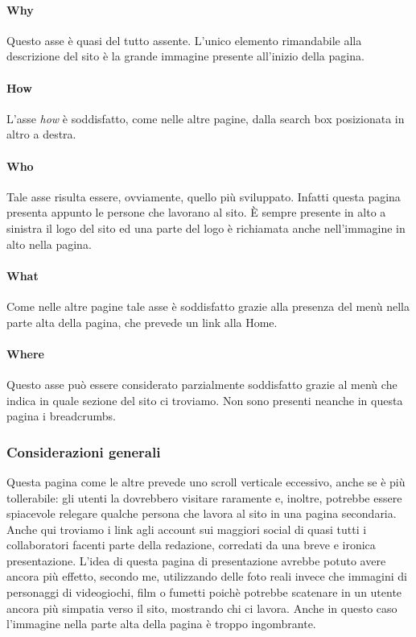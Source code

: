 \documentclass[../ProgettoTecWeb2.tex]{subfiles}
\begin{document}
			\paragraph{Why}
			Questo asse è quasi del tutto assente. L'unico elemento rimandabile alla descrizione del sito è la grande immagine presente all'inizio della pagina.

			\paragraph{How}
			L'asse \textit{how} è soddisfatto, come nelle altre pagine, dalla search box posizionata in altro a destra.
			
			\paragraph{Who}
			Tale asse risulta essere, ovviamente, quello più sviluppato. Infatti questa pagina presenta appunto le persone che lavorano al sito. È sempre presente in alto a sinistra il logo del sito ed una parte del logo è richiamata anche nell'immagine in alto nella pagina.

			\paragraph{What}
			Come nelle altre pagine tale asse è soddisfatto grazie alla presenza del menù nella parte alta della pagina, che prevede un link alla Home.

			\paragraph{Where}
			Questo asse può essere considerato parzialmente soddisfatto grazie al menù che indica in quale sezione del sito ci troviamo. Non sono presenti neanche in questa pagina i breadcrumbs.
		
		\subsubsection{Considerazioni generali}
		Questa pagina come le altre prevede uno scroll verticale eccessivo, anche se è più tollerabile: gli utenti la dovrebbero visitare raramente e, inoltre, potrebbe essere spiacevole relegare qualche persona che lavora al sito in una pagina secondaria. Anche qui troviamo i link agli account sui maggiori social di quasi tutti i collaboratori facenti parte della redazione, corredati da una breve e ironica presentazione. L'idea di questa pagina di presentazione avrebbe potuto avere ancora più effetto, secondo me, utilizzando delle foto reali invece che immagini di personaggi di videogiochi, film o fumetti poichè potrebbe scatenare in un utente ancora più simpatia verso il sito, mostrando chi ci lavora. Anche in questo caso l'immagine nella parte alta della pagina è troppo ingombrante.
\end{document}
